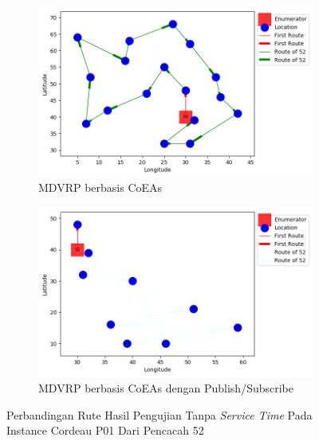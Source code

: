 \begin{figure}[H]
	\centering
	\begin{subfigure}[t]{\textwidth}
		\centering
		\includegraphics[width=\textwidth]{Resources/Images/cordeau_p01/cordeau_p01_notw_52_coes}
		\caption{MDVRP berbasis CoEAs}
		\label{fig:cordeau_p01_notw_52_coes}
	\end{subfigure}
	\begin{subfigure}[t]{\textwidth}
		\centering
		\includegraphics[width=\textwidth]{Resources/Images/cordeau_p01/cordeau_p01_notw_52_pubsub_coes}
		\caption{MDVRP berbasis CoEAs dengan Publish/Subscribe}
		\label{fig:cordeau_p01_notw_52_pubsub_coes}
	\end{subfigure}
	\caption{Perbandingan Rute Hasil Pengujian Tanpa \textit{Service Time} Pada Instance Cordeau P01 Dari Pencacah 52}
	\label{fig:cordeau_p01_notw_52}
\end{figure}


